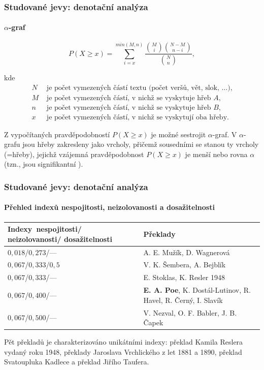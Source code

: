 \documentclass[12pt,xcolor=usenames,dvipsnames]{beamer}
\begin{document}
\begin{frame}
	\frametitle{Studované jevy:  denotační analýza}
	\framesubtitle{$\alpha$-graf}

	\vspace{-15pt}
	\begin{equation*}
		P(X \geq x)=\sum_{i=x}^{min{\left(  M, n \right) }} \frac{\binom{M}{i}\binom{N-M}{n-i}}{\binom{N}{n}},
	\end{equation*}
	\vspace{-16pt}
	\begin{small}
		kde
		\vspace{5pt} 
		\begin{align*}
			N & \text{ je počet vymezených částí textu (počet veršů, vět, slok, \ldots),}\\
			M & \text{ je počet vymezených částí, v nichž se vyskytuje hřeb $A$,}\\
			n & \text{ je počet vymezených částí, v nichž se vyskytuje hřeb $B$,}\\
			x & \text{ je počet vymezených částí, v nichž se vyskytují oba hřeby.}
		\end{align*}  
	\end{small}

	\vspace{-35pt}
	Z vypočítaných pravděpodobností $P(X\geq x)$ je možné sestrojit $\alpha$-graf. V $\alpha$-grafu jsou hřeby zakresleny jako vrcholy, přičemž sousedními se stanou ty vrcholy (=hřeby), jejichž vzájemná pravděpodobnost $P(X\geq x)$ je menší nebo rovna $\alpha$ (tzn., jsou signifikantní ).

\end{frame}

\begin{frame}
	\frametitle{Studované jevy:  denotační analýza}
	\framesubtitle{Přehled indexů nespojitosti, neizolovanosti a dosažitelnosti}

	\begin{tabular}{| p{4.1cm}|p{7.0cm}|}
	\hline
		\bfseries 
		\mbox{Indexy nespojitosti/} neizolovanosti/ \mbox{dosažitelnosti} & \bfseries Překlady \\ 
	\hline $0{,}018$/$0{,}273$/---       & A. E. Mužík, D. Wagnerová \\ 
	\hline $0{,}067$/$0{,}333$/$0{,}5$	 & V. K. Šembera, A. Bejblík \\ 
	\hline $0{,}067$/$0{,}333$/---       & E. Stoklas, K. Resler 1948 \\ 
	\hline $0{,}067$/$0{,}400$/---       & \textbf{E. A. Poe}, K. Dostál-Lutinov, R. Havel, R. Černý, I. Slavík \\ 
	\hline $0{,}067$/$0{,}500$/---       & V. Nezval, O. F. Babler, J. B. Čapek \\ 
	\hline 
	\end{tabular} 
	
	\vspace{-5pt}
	Pět překladů je charakterizováno unikátními indexy: překlad Kamila Reslera vydaný roku 1948, překlady Jaroslava Vrchlického z let 1881 a 1890, překlad Svatoupluka Kadlece a překlad Jiřího Taufera.

\end{frame}
\end{document}
